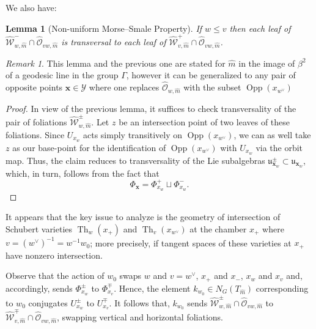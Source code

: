 \documentclass[12pt]{amsbook}%
\newtheorem{lem}[thm]{Lemma}
\theoremstyle{definition}
\theoremstyle{remark}
\newtheorem{rem}[thm]{Remark}
\numberwithin{section}{chapter}
\numberwithin{subsection}{section}
\numberwithin{figure}{chapter}
\DeclareMathOperator{\Th}{Th}
\DeclareMathOperator{\Opp}{Opp}
\newtheorem{conjecture}{Conjecture}
\def\cO{{\mathscr{O}}}
\def\cW{{\mathscr{W}}}
\def\bx{\mathbf{x}}
\begin{document}
{{We also have:  

\begin{lem}[Non-uniform Morse--Smale Property] \label{lem:Morse--Smale Property}
If $w\le v$ then each leaf of $\hat{\cW}^-_{w,\hat{m}}\cap \hat{\cO}_{vw,\hat{m}}$ is transversal to each leaf of 
$\hat{\cW}^+_{v,\hat{m}}\cap \hat{\cO}_{vw,\hat{m}}$. 
\end{lem}

\begin{rem} This lemma  and the previous one are stated for $\hat{m}$ in the image of $\beta^2$ of a geodesic line in the group $\Gamma$, however it can be generalized to any pair of opposite points $\bx \in \mathcal{Y}$ where one replaces $\hat{\cO}_{w, \hat{m}}$ with the subset $\Opp(x_{w^{\vee}})$  
\end{rem}

\begin{proof} In view of the previous lemma, it suffices to check transversality of the pair of foliations $\hat{\cW}^\pm_{w,\hat{m}}$.  
Let $z$ be an intersection point of two leaves of these foliations. Since $U_{x_w}$ acts simply transitively on 
$\Opp(x_{w^\vee})$, we can as well take $z$ as our base-point for the identification of $\Opp(x_{w^\vee})$ with 
$U_{x_w}$ via the orbit map. Thus, the claim reduces to transversality of the Lie subalgebras $\mathfrak{u}^\pm_{\bx_w}\subset \mathfrak{u}_{\bx_w}$, 
which, in turn, follows  from the fact that 
$$
\Phi_{\bx}= \Phi^+_{x_w} \sqcup \Phi^-_{x_w}. 
$$
 \end{proof}


It appears that the key issue to analyze is the geometry of intersection of Schubert varieties $\Th_w(x_+)$  and $\Th_{v}(x_{w^\vee})$ at the chamber $x_+$ where $v=(w^\vee)^{-1}=  w^{-1}w_0 $; 
more precisely, if tangent spaces of these varieties at $x_+$ have nonzero intersection. 

\medskip 
Observe that the action of $w_0$ swaps $w$ and $v=w^\vee$, $x_+$ and $x_-$, $x_w$ and $x_{v}$ 
and, accordingly, sends  $\Phi^\pm_{x_w}$ to  $\Phi^\mp_{x_v}$. 
Hence, the element $k_{w_0}\in N_G(T_{\hat{m}})$ corresponding 
to $w_0$ conjugates $U^\pm_{x_w}$ to $U^\mp_{x_v}$. It follows that, $k_{w_0}$ sends 
$\hat{\cW}^\pm_{w,\hat{m}}\cap \hat{\cO}_{vw,\hat{m}}$ to $\hat{\cW}^\mp_{v,\hat{m}}\cap \hat{\cO}_{vw,\hat{m}}$, swapping vertical and horizontal foliations. 

}}
\end{document}

